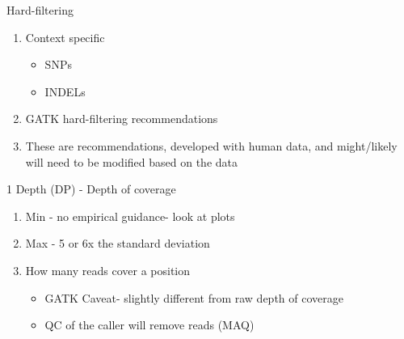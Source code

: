 \documentclass[t,10pt]{beamer}
\begin{document}
\begin{frame}[label={sec:orgheadline6}]{Hard-filtering}
\begin{enumerate}[<+->]
\item Context specific
\begin{itemize}
\item SNPs
\item INDELs
\end{itemize}
\item GATK hard-filtering recommendations
\item These are \alert{recommendations}, developed with \alert{human} data, and might/likely will need to be modified based on the data
\end{enumerate}
\end{frame}

\begin{frame}[label={sec:orgheadline7}]{1 Depth (DP) - Depth of coverage}
\begin{enumerate}[<+->]
\item Min - no empirical guidance- look at plots
\item Max - 5 or 6x the standard deviation
\item How many reads cover a position
\begin{itemize}
\item GATK Caveat- slightly different from \alert{raw} depth of coverage
\item QC of the caller will remove reads (MAQ)
\end{itemize}
\end{enumerate}
\end{frame}
\end{document}
